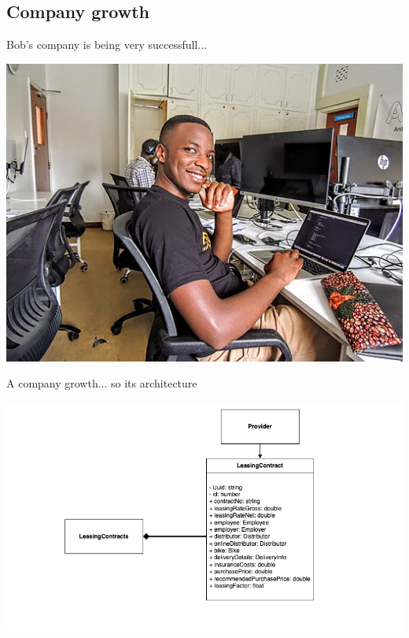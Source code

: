 \subsection{Company growth}

\begin{frame}{Bob's company is being very successfull...}
  \begin{center}
    \includegraphics[width=.7\textwidth]{./assets/bob.jpeg}
  \end{center}
\end{frame}

\begin{frame}{A company growth... so its architecture}
  \begin{center}
    \includegraphics[scale=.5]{./assets/model1}
  \end{center}
\end{frame}

